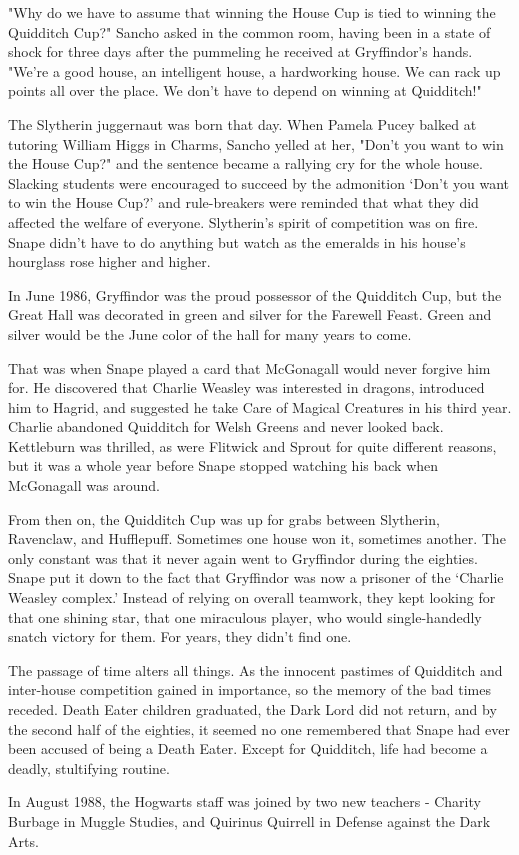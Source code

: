 "Why do we have to assume that winning the House Cup is tied to winning the Quidditch Cup?" Sancho asked in the common room, having been in a state of shock for three days after the pummeling he received at Gryffindor's hands. "We're a good house, an intelligent house, a hardworking house. We can rack up points all over the place. We don't have to depend on winning at Quidditch!"

The Slytherin juggernaut was born that day. When Pamela Pucey balked at tutoring William Higgs in Charms, Sancho yelled at her, "Don't you want to win the House Cup?" and the sentence became a rallying cry for the whole house. Slacking students were encouraged to succeed by the admonition `Don't you want to win the House Cup?' and rule-breakers were reminded that what they did affected the welfare of everyone. Slytherin's spirit of competition was on fire. Snape didn't have to do anything but watch as the emeralds in his house's hourglass rose higher and higher.

In June 1986, Gryffindor was the proud possessor of the Quidditch Cup, but the Great Hall was decorated in green and silver for the Farewell Feast. Green and silver would be the June color of the hall for many years to come.

That was when Snape played a card that McGonagall would never forgive him for. He discovered that Charlie Weasley was interested in dragons, introduced him to Hagrid, and suggested he take Care of Magical Creatures in his third year. Charlie abandoned Quidditch for Welsh Greens and never looked back. Kettleburn was thrilled, as were Flitwick and Sprout for quite different reasons, but it was a whole year before Snape stopped watching his back when McGonagall was around.

From then on, the Quidditch Cup was up for grabs between Slytherin, Ravenclaw, and Hufflepuff. Sometimes one house won it, sometimes another. The only constant was that it never again went to Gryffindor during the eighties. Snape put it down to the fact that Gryffindor was now a prisoner of the `Charlie Weasley complex.' Instead of relying on overall teamwork, they kept looking for that one shining star, that one miraculous player, who would single-handedly snatch victory for them. For years, they didn't find one.

The passage of time alters all things. As the innocent pastimes of Quidditch and inter-house competition gained in importance, so the memory of the bad times receded. Death Eater children graduated, the Dark Lord did not return, and by the second half of the eighties, it seemed no one remembered that Snape had ever been accused of being a Death Eater. Except for Quidditch, life had become a deadly, stultifying routine.

In August 1988, the Hogwarts staff was joined by two new teachers - Charity Burbage in Muggle Studies, and Quirinus Quirrell in Defense against the Dark Arts.


